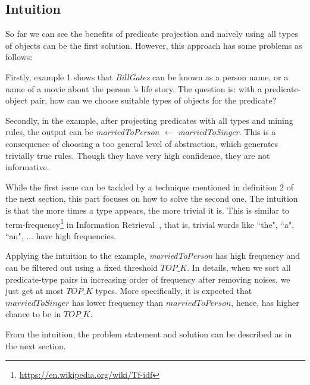 \documentclass{acm_proc_article-sp}
\begin{document}
\subsection{Intuition}
\label{intuition}


So far we can see the benefits of predicate projection and naively using all types of objects can be the first solution. However, this approach has some problems as follows:

Firstly, example 1 shows that \textit{BillGates} can be known as a person name, or a name of a movie about the person 's life story. The question is: with a predicate-object pair, how can we choose suitable types of objects for the predicate?

Secondly, in the example, after projecting predicates with all types and mining rules, the output can be \textit{marriedToPerson $\leftarrow$ marriedToSinger}. This is a consequence of choosing a too general level of abstraction, which generates trivially true rules. Though they have very high confidence, they are not informative.

While the first issue can be tackled by a technique mentioned in definition 2 of the next section, this part focuses on how to solve the second one. The intuition is that the more times a type appears, the more trivial it is. This is similar to term-frequency\footnote{\url{https://en.wikipedia.org/wiki/Tf-idf}} in Information Retrieval~\cite{ref2}, that is, trivial words like ``the", ``a", ``an", ... have high frequencies.

Applying the intuition to the example, \textit{marriedToPerson} has high frequency and can be filtered out using a fixed threshold $TOP\_K$. In details, when we sort all predicate-type pairs in increasing order of frequency after removing noises, we just get at most $TOP\_K$ types. More specifically, it is expected that $marriedToSinger$ has lower frequency than $marriedToPerson$, hence, has higher chance to be in $TOP\_K$.

From the intuition, the problem statement and solution can be described as in the next section.
\end{document}
